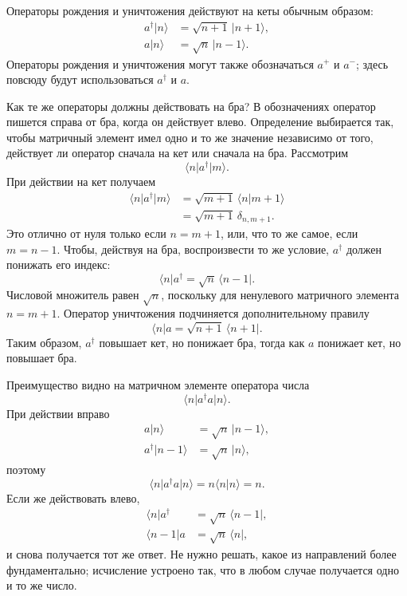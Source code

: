 Операторы рождения и уничтожения действуют на кеты обычным образом:
\begin{align}
a^\dagger\lvert n\rangle&=\sqrt{n+1}\,\lvert n+1\rangle,\\
a\lvert n\rangle&=\sqrt n\,\lvert n-1\rangle.
\end{align}
Операторы рождения и уничтожения могут также обозначаться \(a^+\) и \(a^-\); здесь повсюду будут использоваться \(a^\dagger\) и \(a\).

Как те же операторы должны действовать на бра? В обозначениях оператор пишется справа от бра, когда он действует влево. Определение выбирается так, чтобы матричный элемент имел одно и то же значение независимо от того, действует ли оператор сначала на кет или сначала на бра. Рассмотрим
\begin{equation}
\langle n\rvert a^\dagger\lvert m\rangle.
\end{equation}
При действии на кет получаем
\begin{align}
\langle n\rvert a^\dagger\lvert m\rangle
&=\sqrt{m+1}\,\langle n\vert m+1\rangle\\
&=\sqrt{m+1}\,\delta_{n,m+1}.
\end{align}
Это отлично от нуля только если \(n=m+1\), или, что то же самое, если \(m=n-1\). Чтобы, действуя на бра, воспроизвести то же условие, \(a^\dagger\) должен понижать его индекс:
\begin{equation}
\langle n\rvert a^\dagger
=\sqrt n\,\langle n-1\rvert.
\end{equation}
Числовой множитель равен \(\sqrt n\), поскольку для ненулевого матричного элемента \(n=m+1\). Оператор уничтожения подчиняется дополнительному правилу
\begin{equation}
\langle n\rvert a
=\sqrt{n+1}\,\langle n+1\rvert.
\end{equation}
Таким образом, \(a^\dagger\) повышает кет, но понижает бра, тогда как \(a\) понижает кет, но повышает бра.

Преимущество видно на матричном элементе оператора числа
\begin{equation}
\langle n\rvert a^\dagger a\lvert n\rangle.
\end{equation}
При действии вправо
\begin{align}
a\lvert n\rangle&=\sqrt n\,\lvert n-1\rangle,\\
a^\dagger\lvert n-1\rangle&=\sqrt n\,\lvert n\rangle,
\end{align}
поэтому
\begin{equation}
\langle n\rvert a^\dagger a\lvert n\rangle
=n\langle n\vert n\rangle=n.
\end{equation}
Если же действовать влево,
\begin{align}
\langle n\rvert a^\dagger&=\sqrt n\,\langle n-1\rvert,\\
\langle n-1\rvert a&=\sqrt n\,\langle n\rvert,
\end{align}
и снова получается тот же ответ. Не нужно решать, какое из направлений более фундаментально; исчисление устроено так, что в любом случае получается одно и то же число.

